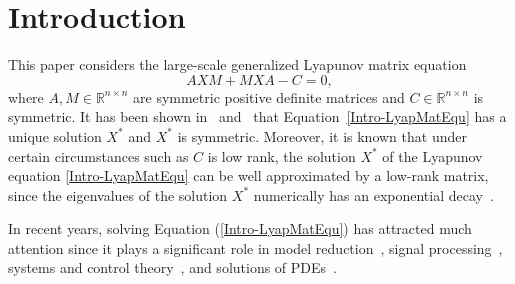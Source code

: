 \documentclass[11pt]{article}
\newcommand{\zwhcomm}[2]{{\sf\color{purple} #1}{\sf\color{blue} #2}}
\numberwithin{equation}{section}
\begin{document}
\section{Introduction} \label{Intro}

This paper considers the large-scale generalized Lyapunov matrix equation 
\begin{equation}
  AXM + MXA - C = 0, \label{Intro-LyapMatEqu}
\end{equation} 
where $A, M \in \mathbb{R}^{n\times n}$ are symmetric positive definite matrices and $C \in \mathbb{R}^{n\times n}$ is symmetric. It has been shown in~\cite{Chu87} and~\cite{penzl_numerical_1998} that Equation~\eqref{Intro-LyapMatEqu} has a unique solution $X^*$ and $X^*$ is symmetric. 
 Moreover, it is known that under certain circumstances such as $C$ is low rank, the solution $X^{*}$ of the Lyapunov equation \eqref{Intro-LyapMatEqu} can be well approximated by a low-rank matrix, since the eigenvalues of the solution $X^*$ numerically has an exponential decay~\cite{PENZL00,Grasedyck2004ExistenceOA}. 

In recent years, solving Equation (\ref{Intro-LyapMatEqu}) has attracted much attention since it plays a significant role in model reduction~\cite{Moore1981PrincipalCA,Schilders2014ModelOR,Hamadi2021AMR,ISC22}, signal processing~\cite{Goyal2020ImageDR}, systems and control theory~\cite{LMESSC96,Antoulas2005ApproximationOL}, and solutions of PDEs~\cite{DV16}. 

	
\end{document}
